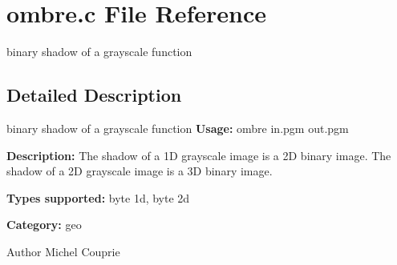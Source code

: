 \section{ombre.c File Reference}
\label{ombre_8c}


binary shadow of a grayscale function  




\subsection{Detailed Description}
binary shadow of a grayscale function {\bfseries Usage:} ombre in.pgm out.pgm

{\bfseries Description:} The shadow of a 1D grayscale image is a 2D binary image. The shadow of a 2D grayscale image is a 3D binary image.

{\bfseries Types supported:} byte 1d, byte 2d

{\bfseries Category:} geo

\begin{DoxyAuthor}{Author}
Michel Couprie 
\end{DoxyAuthor}
